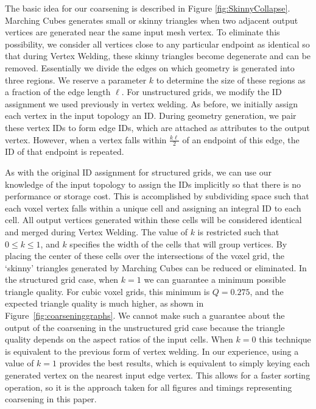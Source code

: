 \documentclass[10pt,journal,cspaper,compsoc]{IEEEtran}
\begin{document}
The basic idea for our coarsening is described in Figure \ref{fig:SkinnyCollapse}. Marching Cubes generates small or skinny triangles when two adjacent output vertices are generated near the same input mesh vertex. To eliminate this possibility, we consider all vertices close to any particular endpoint as identical so that during Vertex Welding, these skinny triangles become degenerate and can be removed. Essentially we divide the edges on which geometry is generated into three regions. We reserve a parameter $k$ to determine the size of these regions as a fraction of the edge length $\ell$. For unstructured grids, we modify the ID assignment we used previously in vertex welding. As before, we initially assign each vertex in the input topology an ID. During geometry generation, we pair these vertex IDs to form edge IDs, which are attached as attributes to the output vertex. However, when a vertex falls within $\frac{k\ell}{2}$ of an endpoint of this edge, the ID of that endpoint is repeated.

As with the original ID assignment for structured grids, we can use our knowledge of the input topology to assign the IDs implicitly so that there is no performance or storage cost. This is accomplished by subdividing space such that each voxel vertex falls within a unique cell and assigning an integral ID to each cell. All output vertices generated within these cells will be considered identical and merged during Vertex Welding. The value of $k$ is restricted such that $0\leq k \leq 1$, and $k$ specifies the width of the cells that will group vertices. By placing the center of these cells over the intersections of the voxel grid, the `skinny' triangles generated by Marching Cubes can be reduced or eliminated. In the structured grid case, when $k=1$ we can guarantee a minimum possible triangle quality. For cubic voxel grids, this minimum is $Q=0.275$, and the expected triangle quality is much higher, as shown in Figure~\ref{fig:coarseninggraphs}. We cannot make such a guarantee about the output of the coarsening in the unstructured grid case because the triangle quality depends on the aspect ratios of the input cells. When $k=0$ this technique is equivalent to the previous form of vertex welding. In our experience, using a value of $k=1$ provides the best results, which is equivalent to simply keying each generated vertex on the nearest input edge vertex. This allows for a faster sorting operation, so it is the approach taken for all figures and timings representing coarsening in this paper.
\end{document}
